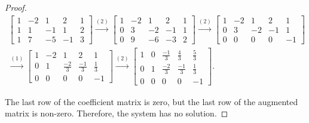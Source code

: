 \begin{proof}
    \begingroup{}
    \allowdisplaybreaks{}
    \begin{align*}
        \left[\begin{array}{cccc|c}
                      1 & -2 & 1  & 2  & 1 \\
                      1 & 1  & -1 & 1  & 2 \\
                      1 & 7  & -5 & -1 & 3
                  \end{array}\right]
        \stackrel{(2)}{\rightarrow}
        \left[\begin{array}{cccc|c}
                      1 & -2 & 1  & 2  & 1 \\
                      0 & 3  & -2 & -1 & 1 \\
                      0 & 9  & -6 & -3 & 2
                  \end{array}\right]
        \stackrel{(2)}{\rightarrow}
        \left[\begin{array}{cccc|c}
                      1 & -2 & 1  & 2  & 1  \\
                      0 & 3  & -2 & -1 & 1  \\
                      0 & 0  & 0  & 0  & -1
                  \end{array}\right] \\
        \stackrel{(1)}{\rightarrow}
        \left[\begin{array}{cccc|c}
                      1 & -2 & 1            & 2            & 1           \\
                      0 & 1  & \frac{-2}{3} & \frac{-1}{3} & \frac{1}{3} \\
                      0 & 0  & 0            & 0            & -1
                  \end{array}\right]
        \stackrel{(2)}{\rightarrow}
        \left[\begin{array}{cccc|c}
                      1 & 0 & \frac{-1}{3} & \frac{4}{3}  & \frac{5}{3} \\
                      0 & 1 & \frac{-2}{3} & \frac{-1}{3} & \frac{1}{3} \\
                      0 & 0 & 0            & 0            & -1
                  \end{array}\right].
    \end{align*}
    \endgroup{}

    The last row of the coefficient matrix is zero, but the last row of the augmented matrix is non-zero. Therefore, the system has no solution.
\end{proof}

